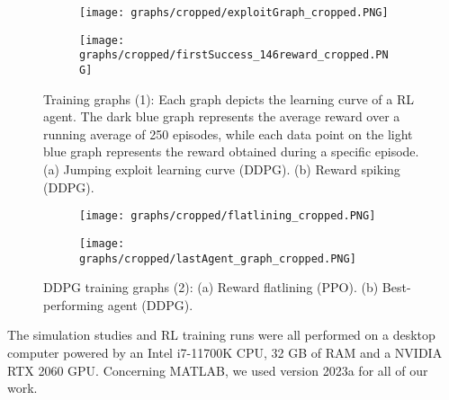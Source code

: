 \begin{figure}[h]
	\begin{subfigure}{\textwidth} %
		\centering
		\texttt{[image: graphs/cropped/exploitGraph\_cropped.PNG]}  %
		\caption{}
		\label{figure: RL a}
	\end{subfigure}
	\begin{subfigure}{\textwidth}
		\centering
		\texttt{[image: graphs/cropped/firstSuccess\_146reward\_cropped.PNG]}  
		\caption{}
		\label{figure: RL b}
	\end{subfigure} 
		\caption[Training Graphs (1)]{Training graphs (1): Each graph depicts the learning curve of a RL agent. The dark blue graph represents the average reward over a running average of 250 episodes, while each data point on the light blue graph represents the reward obtained during a specific episode. (a) Jumping exploit learning curve (DDPG). (b) Reward spiking (DDPG).
		}
	\label{figure: DDPG learning graphs 1}
\end{figure}

\begin{figure}[h]
	\begin{subfigure}{\textwidth} %
		\centering
		\texttt{[image: graphs/cropped/flatlining\_cropped.PNG]}  %
		\caption{}
		\label{figure: RL c}
	\end{subfigure}
	\begin{subfigure}{\textwidth}
		\centering
		\texttt{[image: graphs/cropped/lastAgent\_graph\_cropped.PNG]}  
		\caption{}
		\label{figure: RL d}
	\end{subfigure} 
	\caption[Training Graphs (2)]{DDPG training graphs (2):  (a) Reward flatlining (PPO). (b) Best-performing agent (DDPG).}
	\label{figure: DDPG learning graphs 2}
\end{figure}


The simulation studies and RL training runs were all performed on a desktop computer powered by an Intel i7-11700K CPU, 32 GB of RAM and a NVIDIA RTX 2060 GPU.
Concerning MATLAB, we used version 2023a for all of our work.

